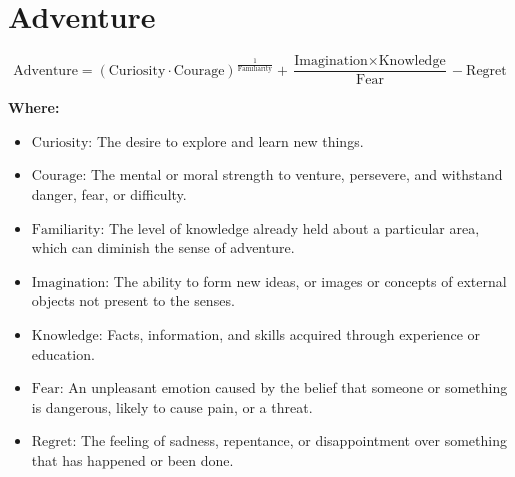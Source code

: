 \chapter{Adventure}

\begin{equation}
\text{Adventure} = (\text{Curiosity} \cdot \text{Courage})^{\frac{1}{\text{Familiarity}}} + \frac{\text{Imagination} \times \text{Knowledge}}{\text{Fear}} - \text{Regret}
\end{equation}

\textbf{Where:}

\begin{itemize}
    \item $\text{Curiosity}$: The desire to explore and learn new things.
    \item $\text{Courage}$: The mental or moral strength to venture, persevere, and withstand danger, fear, or difficulty.
    \item $\text{Familiarity}$: The level of knowledge already held about a particular area, which can diminish the sense of adventure.
    \item $\text{Imagination}$: The ability to form new ideas, or images or concepts of external objects not present to the senses.
    \item $\text{Knowledge}$: Facts, information, and skills acquired through experience or education.
    \item $\text{Fear}$: An unpleasant emotion caused by the belief that someone or something is dangerous, likely to cause pain, or a threat.
    \item $\text{Regret}$: The feeling of sadness, repentance, or disappointment over something that has happened or been done.
\end{itemize}